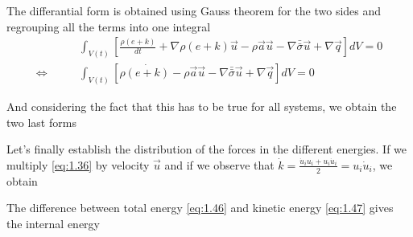 		The differantial form is obtained using Gauss theorem for the two sides and regrouping all the terms into one integral
		\begin{equation}
		\begin{aligned}
			&\int _{V(t)} \left[\frac{\rho (e+k)}{dt} + \nabla \rho (e+k)\vec{u} - \rho \vec{a} \vec{u} - \nabla \bar{\bar{\sigma}}\vec{u} + \nabla \vec{q} \right] dV = 0 \\
			\Leftrightarrow \qquad &\int _{V(t)} \left[\rho\dot{(e+k)} - \rho \vec{a} \vec{u} - \nabla \bar{\bar{\sigma}}\vec{u} + \nabla \vec{q} \right] dV = 0
		\end{aligned}
		\end{equation}
		
		And considering the fact that this has to be true for all systems, we obtain the two last forms
		\begin{center}
		\end{center}
		\begin{center}
		\end{center}
		Let's finally establish the distribution of the forces in the different energies. If we multiply \autoref{eq:1.36} by velocity $\vec{u}$ and if we observe that $\dot{k} = \frac{\dot{u}_i u_i+u_i\dot{u}_i}{2} = u_i \dot{u}_i$, we obtain 
		
		\begin{center}
		\end{center}
		The difference between total energy \autoref{eq:1.46} and kinetic energy \autoref{eq:1.47} gives the internal energy
		
